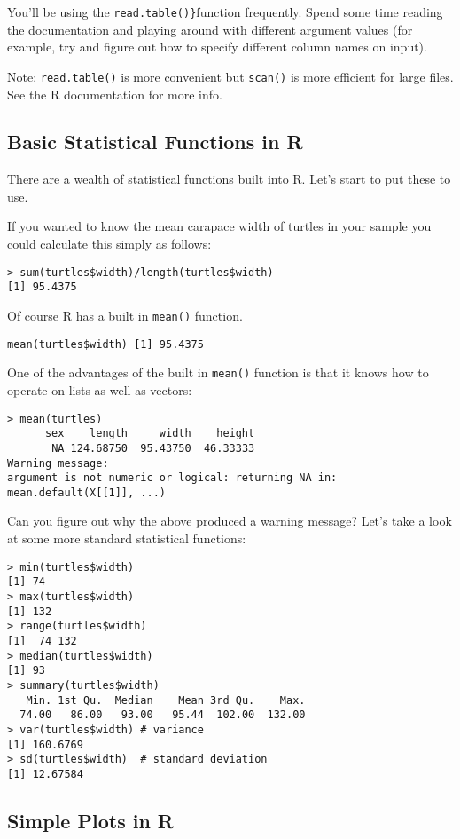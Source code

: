 \documentclass{article}
\begin{document}
You'll be using the \lstinline!read.table()}!function frequently. Spend
some time reading the documentation and playing around with different
argument values (for example, try and figure out how to specify
different column names on input).

Note: \lstinline!read.table()! is more convenient but \lstinline!scan()!
is more efficient for large files. See the R documentation for more
info.

\subsection{Basic Statistical Functions in R}

There are a wealth of statistical functions built into R. Let's start to
put these to use.

If you wanted to know the mean carapace width of turtles in your sample
you could calculate this simply as follows:

\begin{lstlisting}
> sum(turtles$width)/length(turtles$width)
[1] 95.4375
\end{lstlisting}
Of course R has a built in \lstinline!mean()! function.

\begin{lstlisting}
mean(turtles$width) [1] 95.4375
\end{lstlisting}
One of the advantages of the built in \lstinline!mean()! function is
that it knows how to operate on lists as well as vectors:

\begin{lstlisting}
> mean(turtles)
      sex    length     width    height 
       NA 124.68750  95.43750  46.33333 
Warning message:
argument is not numeric or logical: returning NA in: mean.default(X[[1]], ...) 
\end{lstlisting}
Can you figure out why the above produced a warning message? Let's take
a look at some more standard statistical functions:

\begin{lstlisting}
> min(turtles$width)
[1] 74
> max(turtles$width)
[1] 132
> range(turtles$width)
[1]  74 132
> median(turtles$width)
[1] 93
> summary(turtles$width)
   Min. 1st Qu.  Median    Mean 3rd Qu.    Max. 
  74.00   86.00   93.00   95.44  102.00  132.00 
> var(turtles$width) # variance
[1] 160.6769
> sd(turtles$width)  # standard deviation
[1] 12.67584
\end{lstlisting}
\subsection{Simple Plots in R}
\end{document}
